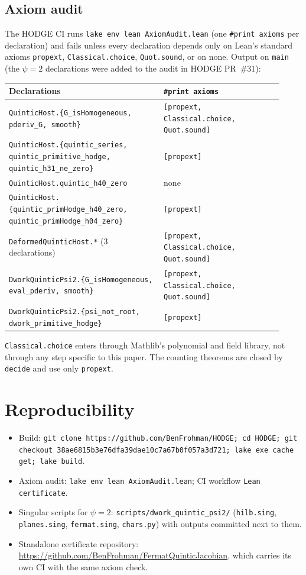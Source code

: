 \documentclass[11pt]{article}
\theoremstyle{definition}\newtheorem{definition}[theorem]{Definition}\newtheorem{remark}[theorem]{Remark}
\begin{document}
\subsection{Axiom audit}
The HODGE CI runs \texttt{lake env lean AxiomAudit.lean} (one \texttt{\#print axioms} per declaration)
and fails unless every declaration depends only on Lean's standard axioms
\texttt{propext}, \texttt{Classical.choice}, \texttt{Quot.sound}, or on none. Output on \texttt{main} (the $\psi=2$ declarations were added to the audit in HODGE PR~\#31):
\begin{center}\small
\begin{tabular}{p{0.52\linewidth}p{0.40\linewidth}}\toprule
Declarations & \texttt{\#print axioms}\\\midrule
\texttt{QuinticHost.\{G\_isHomogeneous, pderiv\_G, smooth\}} & \texttt{[propext, Classical.choice, Quot.sound]}\\
\texttt{QuinticHost.\{quintic\_series, quintic\_primitive\_hodge, quintic\_h31\_ne\_zero\}} & \texttt{[propext]}\\
\texttt{QuinticHost.quintic\_h40\_zero} & none\\
\texttt{QuinticHost.\{quintic\_primHodge\_h40\_zero, quintic\_primHodge\_h04\_zero\}} & \texttt{[propext]}\\
\texttt{DeformedQuinticHost.*} (3 declarations) & \texttt{[propext, Classical.choice, Quot.sound]}\\
\texttt{DworkQuinticPsi2.\{G\_isHomogeneous, eval\_pderiv, smooth\}} & \texttt{[propext, Classical.choice, Quot.sound]}\\
\texttt{DworkQuinticPsi2.\{psi\_not\_root, dwork\_primitive\_hodge\}} & \texttt{[propext]}\\
\bottomrule\end{tabular}\end{center}
\texttt{Classical.choice} enters through Mathlib's polynomial and field library, not through any
step specific to this paper. The counting theorems are closed by \texttt{decide} and use only \texttt{propext}.
\section{Reproducibility}
\begin{itemize}
\item Build: \texttt{git clone https://github.com/BenFrohman/HODGE; cd HODGE; git checkout 38ae6815b3e76dfa39dae10c7a67b0f057a3d721; lake exe cache get; lake build}.
\item Axiom audit: \texttt{lake env lean AxiomAudit.lean}; CI workflow \texttt{Lean certificate}.
\item Singular scripts for $\psi=2$: \texttt{scripts/dwork\_quintic\_psi2/} (\texttt{hilb.sing}, \texttt{planes.sing},
\texttt{fermat.sing}, \texttt{chars.py}) with outputs committed next to them.
\item Standalone certificate repository: \url{https://github.com/BenFrohman/FermatQuinticJacobian}, which carries its own
CI with the same axiom check.
\end{itemize}
\end{document}
